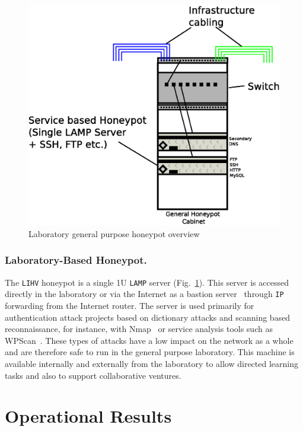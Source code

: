\documentclass{llncs}
\begin{document}
\begin{figure}[h]
\begin{center}
	\includegraphics[scale=0.4]{Images/Infrastructure2.eps}
\caption{Laboratory general purpose honeypot overview}
\label{fig:Overview2}
\end{center}
\end{figure}

\subsubsection{Laboratory-Based Honeypot.}

The \texttt{LIHV} honeypot is a single 1U \texttt{LAMP} server
(Fig.~\ref{fig:Overview2}). This server is accessed directly in the
laboratory or via the Internet as a bastion server~\cite{MB:05} through
\texttt{IP} forwarding from the Internet router. The server is used primarily
for authentication attack projects based on dictionary attacks and scanning
based reconnaissance, for instance, with Nmap~\cite{GFL:09} or service analysis
tools such as WPScan~\cite{WT:17}. These types of attacks have a low impact on
the network as a whole and are therefore safe to run in the general purpose
laboratory. This machine is available internally and externally from the
laboratory to allow directed learning tasks and also to support collaborative
ventures.

\section{Operational Results\label{Results}}
\end{document}
